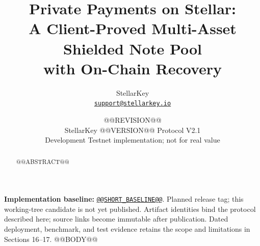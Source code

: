 \documentclass[11pt,letterpaper]{article}
\title{\textbf{Private Payments on Stellar:}\\[3pt]
A Client-Proved Multi-Asset Shielded Note Pool\\
with On-Chain Recovery}
\author{StellarKey\\\small\href{mailto:support@stellarkey.io}{\texttt{support@stellarkey.io}}}
\date{@@REVISION@@\\[5pt]
\small StellarKey @@VERSION@@ \textperiodcentered{} Protocol V2.1\\
\small Development Testnet implementation; not for real value}
\begin{document}
\maketitle
\begin{abstract}
@@ABSTRACT@@
\end{abstract}
\vspace{0.5em}
{\small\textbf{Implementation baseline:}
\href{https://github.com/stellarchain/io.stellarkey/tree/@@BASELINE@@}{\texttt{@@SHORT_BASELINE@@}}.
Planned release tag; this working-tree candidate is not yet published. Artifact identities bind
the protocol described here; source links become immutable after publication. Dated deployment,
benchmark, and test evidence retains the scope and limitations in Sections 16--17.}
\clearpage
\begingroup
\small
\setlength{\parskip}{0pt}
\tableofcontents
\endgroup
\clearpage
@@BODY@@
\end{document}
